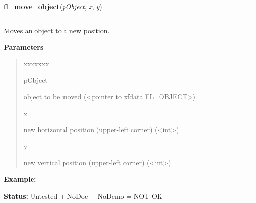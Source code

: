     \vspace{0.5ex}

\hspace{.8\funcindent}\begin{boxedminipage}{\funcwidth}

    \raggedright \textbf{fl\_move\_object}(\textit{pObject}, \textit{x}, \textit{y})

    \vspace{-1.5ex}

    \rule{\textwidth}{0.5\fboxrule}
\setlength{\parskip}{2ex}
    Moves an object to a new position.

\setlength{\parskip}{1ex}
      \textbf{Parameters}
      \vspace{-1ex}

      \begin{quote}
        \begin{Ventry}{xxxxxxx}

          \item[pObject]

          object to be moved ({\textless}pointer to 
          xfdata.FL\_OBJECT{\textgreater})

          \item[x]

          new horizontal position (upper-left corner) 
          ({\textless}int{\textgreater})

          \item[y]

          new vertical position (upper-left corner) 
          ({\textless}int{\textgreater})

        \end{Ventry}

      \end{quote}

\textbf{Example:} 

\textbf{Status:} Untested + NoDoc + NoDemo = NOT OK



    \end{boxedminipage}

    \label{xformslib:library:fl_fit_object_label}

    \vspace{0.5ex}

